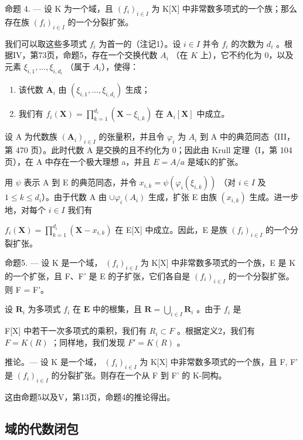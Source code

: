命题 4. --- 设 K 为一个域，且 \((f_{i})_{i\in I}\) 为 K{[}X{]} 中非常数多项式的一个族；那么存在族 \((f_{i})_{i\in I}\) 的一个分裂扩张。

我们可以取这些多项式 \(f_{i}\) 为首一的（注记1）。设 \(i \in I\) 并令 \(f_{i}\) 的次数为 \(d_{i}\) 。根据IV，第73页，命题5，存在一个交换代数 \(A_{i}\) （在 \(K\) 上），它不约化为 0，以及元素 \(\xi_{i,1}, \ldots, \xi_{i,d_{i}}\) （属于 \(A_{i}\)），使得：

\begin{enumerate}
\def\labelenumi{\alph{enumi})}
\item
  该代数 \(\mathbf{A}_i\) 由 \((\xi_{i,1},\dots,\xi_{i,d_i})\) 生成；
\item
  我们有 \(f_{i}(\mathbf{X}) = \prod_{k=1}^{d_{i}} (\mathbf{X} - \xi_{i,k})\) 在 \(\mathbf{A}_i[\mathbf{X}]\) 中成立。
\end{enumerate}

设 A 为代数族 \((\mathbf{A}_{i})_{i\in I}\) 的张量积，并且令 \(\varphi_{i}\) 为 \(A_{i}\) 到 A 中的典范同态（III，第 470 页）。此时代数 A 是交换的且不约化为 0；因此由 Krull 定理（I，第 104 页），在 A 中存在一个极大理想 a，并且 \(E = A/a\) 是域K的扩张。

用 \(\psi\) 表示 A 到 E 的典范同态，并令 \(x_{i,k} = \psi (\varphi_i(\xi_{i,k}))\) （对 \(i\in I\) 及 \(1\leqslant k\leqslant d_i\)）。由于代数 A 由 \(\cup \varphi_i(A_i)\) 生成，扩张 E 由族 \((x_{i,k})\) 生成。进一步地，对每个 \(i\in I\) 我们有

\(f_{i}(\mathbf{X}) = \prod_{k=1}^{d_{i}} (\mathbf{X} - x_{i,k})\) 在 E{[}X{]} 中成立。因此，E 是族 \((f_{i})_{i \in I}\) 的一个分裂扩张。

命题5. --- 设 K 是一个域， \((f_i)_{i \in I}\) 为 K{[}X{]} 中非常数多项式的一个族，E 是 K 的一个扩张，且 F、F' 是 E 的子扩张，它们各自是 \((f_i)_{i \in I}\) 的一个分裂扩张。则 F = F'。

设 \(\mathbf{R}_i\) 为多项式 \(f_i\) 在 \(\mathbf{E}\) 中的根集，且 \(\mathbf{R} = \bigcup_{i\in I}\mathbf{R}_i\) 。由于 \(f_i\) 是

F{[}X{]} 中若干一次多项式的乘积，我们有 \(R_{i} \subset F\) 。根据定义2，我们有 \(F = K(R)\) ；同样地，我们发现 \(F' = K(R)\) 。

推论。--- 设 K 是一个域， \((f_{i})_{i\in I}\) 为 K{[}X{]} 中非常数多项式的一个族，且 F, F' 是 \((f_{i})_{i\in I}\) 的分裂扩张。则存在一个从 F 到 F' 的 K-同构。

这由命题5以及V，第13页，命题4的推论得出。

\subsection{域的代数闭包}

